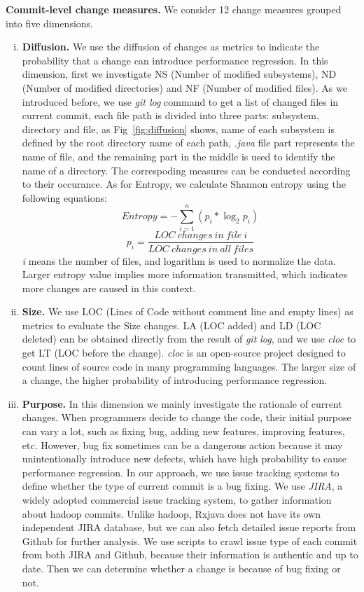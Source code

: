  \textbf{Commit-level change measures.} We consider 12 change measures grouped into five dimensions.
\begin{enumerate}[(i)]
	\item \noindent
	\textbf{Diffusion.} We use the diffusion of changes as metrics to indicate the probability that a change can introduce performance regression. In this dimension, first we investigate NS (Number of modified subsystems), ND (Number of modified directories) and NF (Number of modified files). As we introduced before, we use \textit{git log} command to get a list of changed files in current commit, each file path is divided into three parts: subsystem, directory and file, as Fig~\ref{fig:diffusion} shows, name of each subsystem is defined by the root directory name of each path, \textit{.java} file part represents the name of file, and the remaining part in the middle is used to identify the name of a directory. The correspoding measures can be conducted according to their occurance. As for Entropy, we calculate Shannon entropy using the following equations:
	\begin{equation}
		Entropy = - \sum_{i=1}^{n}\left (p_{i}\ast \log_2 p_{i} \right )
	\end{equation}
	\begin{equation}
		p_{i} =\frac{LOC\ changes\ in\ file\ i}{LOC\ changes\ in\ all\ files}
	\end{equation}
	\textit{i} means the number of files, and logarithm is used to normalize the data. Larger entropy value implies more information transmitted, which indicates more changes are caused in this context.
	
	\item \noindent
	\textbf{Size.}
	We use LOC (Lines of Code without comment line and empty lines) as metrics to evaluate the Size changes. LA (LOC added) and LD (LOC deleted) can be obtained directly from the result of \textit{git log}, and we use \textit{cloc} to get LT (LOC before the change). \textit{cloc} is an open-source project designed to count lines of source code in many programming languages. The larger size of a change,  the higher probability of introducing performance regression.
	
	\item \noindent
	\textbf{Purpose.}
	In this dimension we mainly investigate the rationale of current changes. When programmers decide to change the code, their initial purpose can vary a lot, such as fixing bug, adding new features, improving features, etc.
	However, bug fix sometimes can be a dangerous action because it may unintentionally introduce new defects, which have high probability to cause performance regression. In our approach, we use issue tracking systems to define whether the type of current commit is a bug fixing. We use \textit{JIRA}, a widely adopted commercial issue tracking system, to gather information about hadoop commits. Unlike hadoop, Rxjava does not have its own independent JIRA database, but we can also fetch detailed issue reports from Github for further analysis. We use scripts to crawl issue type of each commit from both JIRA and Github, because their information is authentic and up to date. Then we can determine whether a change is because of bug fixing or not.
	

\end{enumerate}

